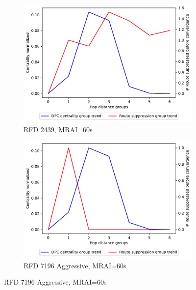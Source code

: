 \begin{figure}[H]
\begin{subfigure}[b]{0.325\textwidth}
     \end{subfigure}
     \vfill
     \begin{subfigure}[b]{0.325\textwidth}
         \centering
         \includegraphics[width=\textwidth]{images/RFD/miceVSelephants/MultiMRAI/60/elephants/cisco_1000_RFD_nodeConvergence_centVSsup_trend.pdf}
         \caption{\scriptsize RFD 2439, MRAI=60s}
         \label{fig:1000_2439RFD_centVSsup_elephants_MRAI60}
     \end{subfigure}
     \hfill
     \begin{subfigure}[b]{0.325\textwidth}
         \centering
         \includegraphics[width=\textwidth]{images/RFD/miceVSelephants/MultiMRAI/60/elephants/cisco_1000_RFD_7196_aggressive_nodeConvergence_centVSsup_trend.pdf}
         \caption{\scriptsize RFD 7196 Aggressive, MRAI=60s}
         \label{fig:1000_7196RFDA_centVSsup_elephants_MRAI60}

\end{subfigure}
\end{figure}
